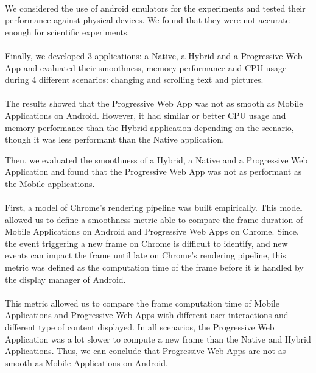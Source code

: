 \documentclass{kththesis}
\begin{document}
\paragraph{}
We considered the use of android emulators for the experiments and tested their performance against physical devices. We found that they were not accurate enough for scientific experiments.

\paragraph{}
Finally, we developed 3 applications: a Native, a Hybrid and a Progressive Web App and evaluated their smoothness, memory performance and CPU usage during 4 different scenarios: changing and scrolling text and pictures. 

\paragraph{}
The results showed that the Progressive Web App was not as smooth as Mobile Applications on Android. However, it had similar or better CPU usage and memory performance than the Hybrid application depending on the scenario, though it was less performant than the Native application.

\iffalse
Then, we evaluated the smoothness of a Hybrid, a Native and a Progressive Web Application and found that the Progressive Web App was not as performant as the Mobile applications. 
\paragraph{}
First, a model of Chrome's rendering pipeline was built empirically. This model allowed us to define a smoothness metric able to compare the frame duration of Mobile Applications on Android and Progressive Web Apps on Chrome. Since, the event triggering a new frame on Chrome is difficult to identify, and new events can impact the frame until late on Chrome's rendering pipeline, this metric was defined as the computation time of the frame before it is handled by the display manager of Android. 
\paragraph{}
This metric allowed us to compare the frame computation time of Mobile Applications and Progressive Web Apps with different user interactions and different type of content displayed. In all scenarios, the Progressive Web Application was a lot slower to compute a new frame than the Native and Hybrid Applications. Thus, we can conclude that Progressive Web Apps are not as smooth as Mobile Applications on Android. 
\end{document}
